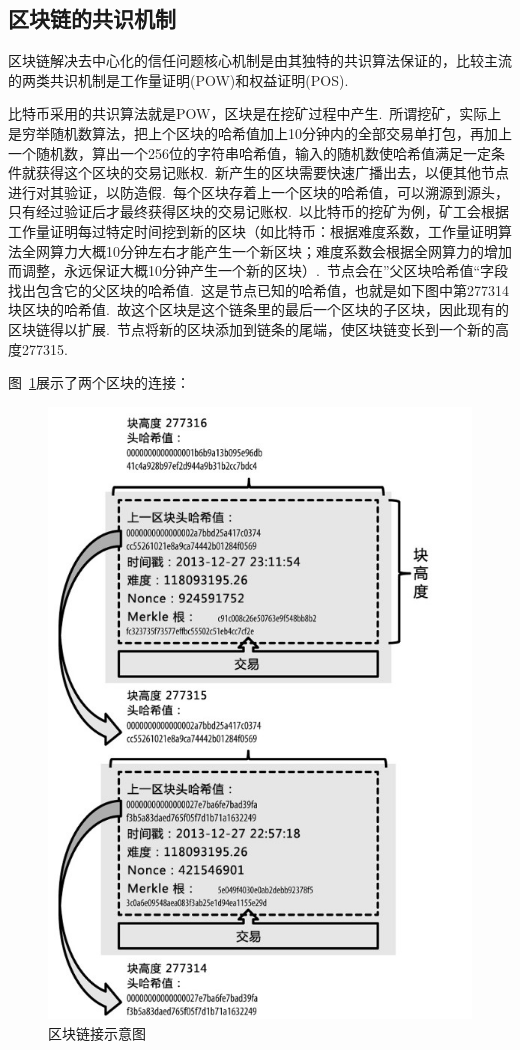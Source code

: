\documentclass[a4paper,12pt,titlepage]{ctexart}
\begin{document}
\subsection{区块链的共识机制}
区块链解决去中心化的信任问题核心机制是由其独特的共识算法保证的，比较主流的两类共识机制是工作量证明(POW)和权益证明(POS).~\par
比特币采用的共识算法就是POW，区块是在挖矿过程中产生.~所谓挖矿，实际上是穷举随机数算法，把上个区块的哈希值加上10分钟内的全部交易单打包，再加上一个随机数，算出一个256位的字符串哈希值，输入的随机数使哈希值满足一定条件就获得这个区块的交易记账权.~新产生的区块需要快速广播出去，以便其他节点进行对其验证，以防造假.~每个区块存着上一个区块的哈希值，可以溯源到源头，只有经过验证后才最终获得区块的交易记账权.~以比特币的挖矿为例，矿工会根据工作量证明每过特定时间挖到新的区块（如比特币：根据难度系数，工作量证明算法全网算力大概10分钟左右才能产生一个新区块；难度系数会根据全网算力的增加而调整，永远保证大概10分钟产生一个新的区块）.~节点会在”父区块哈希值“字段找出包含它的父区块的哈希值.~这是节点已知的哈希值，也就是如下图中第277314块区块的哈希值.~故这个区块是这个链条里的最后一个区块的子区块，因此现有的区块链得以扩展.~节点将新的区块添加到链条的尾端，使区块链变长到一个新的高度277315.~\par
图~\ref{fig2}展示了两个区块的连接：\par
\begin{figure}[!hbp]
	\centering
	\includegraphics[scale=0.48]{fig2.jpg}
    \caption{区块链接示意图}
    \label{fig2}
\end{figure}
\end{document}
